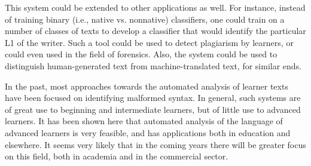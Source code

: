 \documentclass[main.tex]{subfiles}
\begin{document}
This system could be extended to other applications as well. For instance, instead of training binary (i.e., native vs. nonnative) classifiers, one could train on a number of classes of texts to develop a classifier that would identify the particular L1 of the writer. Such a tool could be used to detect plagiarism by learners, or could even used in the field of forensics. Also, the system could be used to distinguish human-generated text from machine-translated text, for similar ends. 

In the past, most approaches towards the automated analysis of learner texts have been focused on identifying malformed syntax. In general, such systems are of great use to beginning and intermediate learners, but of little use to advanced learners. It has been shown here that automated analysis of the language of advanced learners is very feasible, and has applications both in education and elsewhere. It seems very likely that in the coming years there will be greater focus on this field, both in academia and in the commercial sector. 

\biblio
\end{document}
